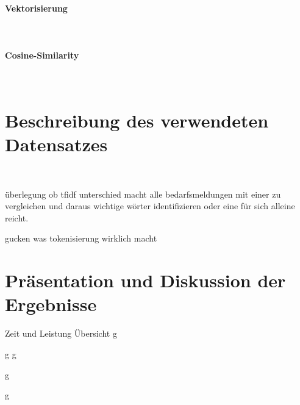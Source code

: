 \paragraph{Vektorisierung}\mbox{}\\

\paragraph{Cosine-Similarity}\mbox{}\\

\section{Beschreibung des verwendeten Datensatzes}
\\
\newpage

überlegung ob tfidf unterschied macht alle bedarfsmeldungen mit einer zu vergleichen und daraus wichtige wörter identifizieren oder eine für sich alleine reicht.

gucken was tokenisierung wirklich macht
\section{Präsentation und Diskussion der Ergebnisse}
Zeit und Leistung Übersicht
\newpage
g
\newpage

\newpage
g
\newpage
g
\newpage

g
\newpage

\newpage
g
\newpage
